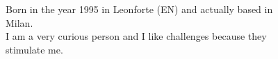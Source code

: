 \documentclass[9pt]{developercv} %
\begin{document}
\vspace{0.5cm}



\begin{figure}[!htb]
    \centering
    \begin{minipage}{0.5\textwidth} %
    \vspace{0.3cm}
	\vspace{-\baselineskip} %
	
	Born in the year 1995 in Leonforte (EN) and actually based in Milan.\\
	I am a very curious person and I like challenges because they stimulate me.\\

	\end{minipage}
	\hfill %
	\begin{minipage}{0.4\textwidth} %
		\centering
	\end{minipage}
\end{figure}

\vspace{0.5cm}






\end{document}
